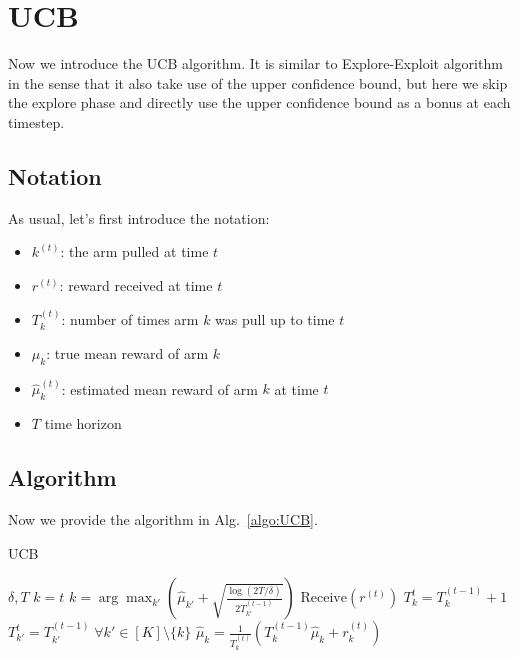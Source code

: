 \documentclass[11pt]{article}
\begin{document}
\section{UCB}
Now we introduce the UCB algorithm. It is similar to Explore-Exploit algorithm in the sense that it also take use of the upper confidence bound, but here we skip the explore phase and directly use the upper confidence bound as a bonus at each timestep.
\subsection{Notation}
As usual, let's first introduce the notation:
\begin{itemize}
    \item $k^{(t)}$: the arm pulled at time $t$
    \item $r^{(t)}$: reward received at time $t$
    \item $T_k^{(t)}$: number of times arm $k$ was pull up to time $t$
    \item $\mu_k$: true mean reward of arm $k$
    \item $\widehat{\mu}_k^{(t)}$: estimated mean reward of arm $k$ at time $t$
    \item $T$ time horizon
\end{itemize}

\subsection{Algorithm}
Now we provide the algorithm in Alg.~\ref{algo:UCB}.

\begin{algorithm}[H]
\caption{UCB}
\label{algo:UCB}
\begin{algorithmic}[1]
\REQUIRE $\delta, T$
\STATE $k = t$
\ELSE
\STATE $k = \arg\max_{k'} \left( \widehat{\mu}_{k'} + \sqrt{\frac{\log(2T/\delta)}{2T^{(t-1)}_{k'}}} \right)$
\ENDIF
\STATE $\text{Receive}(r^{(t)})$
\STATE $T^{t}_k = T^{(t-1)}_k + 1$
\STATE $T^{t}_{k'} = T^{(t-1)}_{k'}\; \forall k' \in [K]\setminus \{k\}$
\STATE $\widehat{\mu}_k = \frac{1}{T_{k}^{(t)}}\left( T^{(t-1)}_k \widehat{\mu}_k + r^{(t)}_k \right)$
\ENDFOR
\end{algorithmic}
\end{algorithm}
\end{document}
